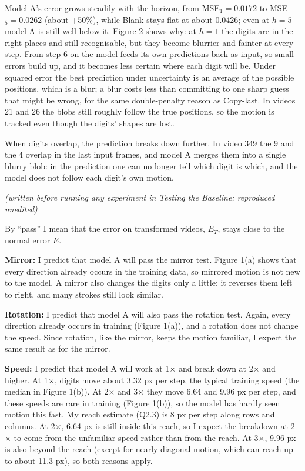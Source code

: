 Model A's error grows steadily with the horizon, from MSE$_1=0.0172$ to MSE$_5=0.0262$ (about +50\%), while Blank stays flat at about 0.0426; even at $h=5$ model A is still well below it. Figure 2 shows why: at $h=1$ the digits are in the right places and still recognisable, but they become blurrier and fainter at every step. From step 6 on the model feeds its own predictions back as input, so small errors build up, and it becomes less certain where each digit will be. Under squared error the best prediction under uncertainty is an average of the possible positions, which is a blur; a blur costs less than committing to one sharp guess that might be wrong, for the same double-penalty reason as Copy-last. In videos 21 and 26 the blobs still roughly follow the true positions, so the motion is tracked even though the digits' shapes are lost.

When digits overlap, the prediction breaks down further. In video 349 the 9 and the 4 overlap in the last input frames, and model A merges them into a single blurry blob: in the prediction one can no longer tell which digit is which, and the model does not follow each digit's own motion.

 \emph{(written before running any experiment in Testing the Baseline; reproduced unedited)}

By ``pass'' I mean that the error on transformed videos, $E_T$, stays close to the normal error $E$.

\textbf{Mirror:} I predict that model A will pass the mirror test. Figure 1(a) shows that every direction already occurs in the training data, so mirrored motion is not new to the model. A mirror also changes the digits only a little: it reverses them left to right, and many strokes still look similar.

\textbf{Rotation:} I predict that model A will also pass the rotation test. Again, every direction already occurs in training (Figure 1(a)), and a rotation does not change the speed. Since rotation, like the mirror, keeps the motion familiar, I expect the same result as for the mirror.

\textbf{Speed:} I predict that model A will work at 1$\times$ and break down at 2$\times$ and higher. At 1$\times$, digits move about 3.32 px per step, the typical training speed (the median in Figure 1(b)). At 2$\times$ and 3$\times$ they move 6.64 and 9.96 px per step, and these speeds are rare in training (Figure 1(b)), so the model has hardly seen motion this fast. My reach estimate (Q2.3) is 8 px per step along rows and columns. At 2$\times$, 6.64 px is still inside this reach, so I expect the breakdown at 2$\times$ to come from the unfamiliar speed rather than from the reach. At 3$\times$, 9.96 px is also beyond the reach (except for nearly diagonal motion, which can reach up to about 11.3 px), so both reasons apply.

